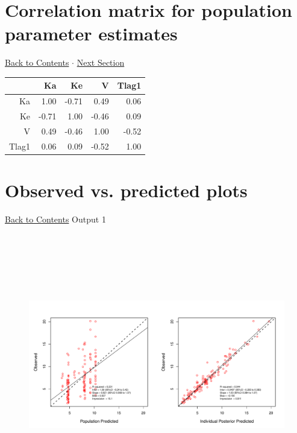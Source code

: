 \documentclass{article}
\begin{document}
          \section{Correlation matrix for population parameter estimates} 
 \hyperlink{tableofcontents}{Back to Contents} $\cdot$ \hyperlink{opp}{Next Section} \newline
          \newline 
\begin{tabular}{rrrrr}
  \hline
 & Ka & Ke & V & Tlag1 \\ 
  \hline
Ka & 1.00 & -0.71 & 0.49 & 0.06 \\ 
  Ke & -0.71 & 1.00 & -0.46 & 0.09 \\ 
  V & 0.49 & -0.46 & 1.00 & -0.52 \\ 
  Tlag1 & 0.06 & 0.09 & -0.52 & 1.00 \\ 
   \hline
\end{tabular}
\newpage
        
        \hypertarget{opp}{}
        
        \section{Observed vs. predicted plots}
        \hyperlink{tableofcontents}{Back to Contents} \newline
        \newline 
Output 1 
\begin{figure}[H] 
              \includegraphics[height=4.5in,width=8in]{op1.pdf} 
              \end{figure} 
\end{document}
